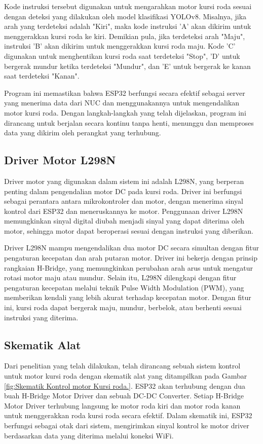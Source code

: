 Kode instruksi tersebut digunakan untuk mengarahkan motor kursi roda sesuai dengan deteksi yang dilakukan oleh model klasifikasi YOLOv8. Misalnya, jika arah yang terdeteksi adalah "Kiri", maka kode instruksi 'A' akan dikirim untuk menggerakkan kursi roda ke kiri. Demikian pula, jika terdeteksi arah "Maju", instruksi 'B' akan dikirim untuk menggerakkan kursi roda maju. Kode 'C' digunakan untuk menghentikan kursi roda saat terdeteksi "Stop", 'D' untuk bergerak mundur ketika terdeteksi "Mundur", dan 'E' untuk bergerak ke kanan saat terdeteksi "Kanan".

Program ini memastikan bahwa ESP32 berfungsi secara efektif sebagai server yang menerima data dari NUC dan menggunakannya untuk mengendalikan motor kursi roda. Dengan langkah-langkah yang telah dijelaskan, program ini dirancang untuk berjalan secara kontinu tanpa henti, menunggu dan memproses data yang dikirim oleh perangkat yang terhubung.

\subsection{Driver Motor L298N}
\label{subsec:drivermotor}
Driver motor yang digunakan dalam sistem ini adalah L298N, yang berperan penting dalam pengendalian motor DC pada kursi roda. Driver ini berfungsi sebagai perantara antara mikrokontroler dan motor, dengan menerima sinyal kontrol dari ESP32 dan meneruskannya ke motor. Penggunaan driver L298N memungkinkan sinyal digital diubah menjadi sinyal yang dapat diterima oleh motor, sehingga motor dapat beroperasi sesuai dengan instruksi yang diberikan.

Driver L298N mampu mengendalikan dua motor DC secara simultan dengan fitur pengaturan kecepatan dan arah putaran motor. Driver ini bekerja dengan prinsip rangkaian H-Bridge, yang memungkinkan perubahan arah arus untuk mengatur rotasi motor maju atau mundur. Selain itu, L298N dilengkapi dengan fitur pengaturan kecepatan melalui teknik Pulse Width Modulation (PWM), yang memberikan kendali yang lebih akurat terhadap kecepatan motor. Dengan fitur ini, kursi roda dapat bergerak maju, mundur, berbelok, atau berhenti sesuai instruksi yang diterima.

\subsection{Skematik Alat}
\label{subsec:skematikalat}

Dari penelitian yang telah dilakukan, telah dirancang sebuah sistem kontrol untuk motor kursi roda dengan skematik alat yang ditampilkan pada Gambar \ref{fig:Skematik Kontrol motor Kursi roda.}. ESP32 akan terhubung dengan dua buah H-Bridge Motor Driver dan sebuah DC-DC Converter. Setiap H-Bridge Motor Driver terhubung langsung ke motor roda kiri dan motor roda kanan untuk menggerakkan roda kursi roda secara efektif. Dalam skematik ini, ESP32 berfungsi sebagai otak dari sistem, mengirimkan sinyal kontrol ke motor driver berdasarkan data yang diterima melalui koneksi WiFi. \parencite{ekatama2024perancangan}

